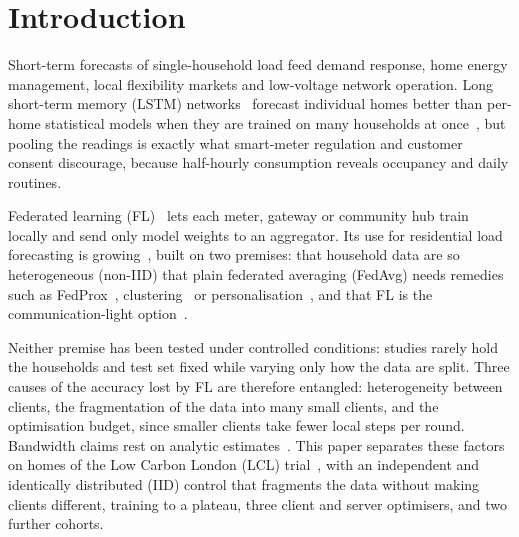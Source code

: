 \section{Introduction}

Short-term forecasts of single-household load feed demand response, home energy management, local flexibility
markets and low-voltage network operation. Long short-term memory (LSTM) networks~\cite{hochreiter1997lstm} forecast individual homes better than
per-home statistical models when they are trained on many households at once~\cite{kong2019stlf,shi2018pdrnn}, but
pooling the readings is exactly what smart-meter regulation and customer consent discourage, because half-hourly
consumption reveals occupancy and daily routines.

Federated learning (FL)~\cite{mcmahan2017fedavg,kairouz2021advances} lets each meter, gateway or community hub train
locally and send only model weights to an aggregator. Its use for residential load forecasting is
growing~\cite{fernndez2022,fekri2022,gholizadeh2022,widmer2023,qu2023,liu2023,das2026}, built on two premises: that
household data are so heterogeneous (non-IID) that plain federated averaging (FedAvg) needs remedies such as
FedProx~\cite{li2020fedprox}, clustering~\cite{gholizadeh2022,dogra2023} or personalisation~\cite{qu2023,widmer2023},
and that FL is the communication-light option~\cite{taik2020,savi2021}.

Neither premise has been tested under controlled conditions: studies rarely hold the households and test set fixed while
varying only how the data are split. Three causes of the accuracy lost by FL are therefore entangled: heterogeneity between clients, the
fragmentation of the data into many small clients, and the optimisation budget, since smaller clients take fewer local
steps per round. Bandwidth claims rest on analytic estimates~\cite{taik2020,briggs2020ccai}. This paper separates these factors on \NumHouseholds{} homes of the Low Carbon
London (LCL) trial~\cite{ukpn2015lcl}, with an independent and identically distributed (IID) control that fragments the
data without making clients different, training to a plateau, three client and server optimisers, and two further
cohorts.

